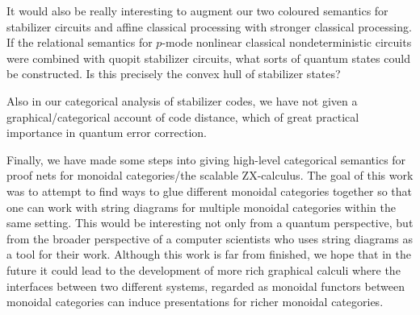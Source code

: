 It would also be really interesting to augment our two coloured semantics for stabilizer circuits and affine classical processing with stronger classical processing.  If the relational semantics for $p$-mode nonlinear classical nondeterministic circuits were combined with quopit stabilizer circuits, what sorts of quantum states could be constructed.  Is this precisely the convex hull of stabilizer states?

Also in our categorical analysis of stabilizer codes, we have not given a graphical/categorical account of code distance, which of great practical importance in quantum error correction. 

Finally, we have made some steps into giving high-level categorical semantics for proof nets for monoidal categories/the scalable ZX-calculus.  The goal of this work was to attempt to find ways to glue different monoidal categories together so that one can work with string diagrams for multiple monoidal categories within the same setting.  This would be interesting not only from a quantum perspective, but from the broader perspective of a computer scientists who uses string diagrams as a tool for their work.  Although this work is far from finished, we hope that in the future it could lead to the development of more rich graphical calculi where the interfaces between two different systems, regarded as monoidal functors between monoidal categories can induce presentations for richer monoidal categories.






